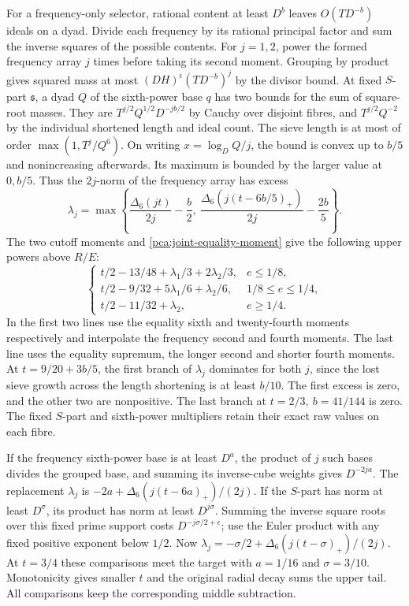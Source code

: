For a frequency-only selector, rational content at least \(D^b\)
leaves \(O(TD^{-b})\) ideals on a dyad. Divide each frequency
by its rational principal factor and sum the inverse squares
of the possible contents. For \(j=1,2\), power the formed
frequency array \(j\) times before taking its second moment.
Grouping by product gives squared mass at most
\((DH)^\epsilon(TD^{-b})^j\) by the divisor bound.
At fixed \(S\)-part \(\mathfrak s\), a dyad \(Q\) of the
sixth-power base \(q\) has two bounds for the sum of square-root
masses. They are \(T^{j/2} Q^{1/2}D^{-jb/2}\)
by Cauchy over disjoint fibres, and \(T^{j/2}Q^{-2}\)
by the individual shortened length and ideal count.
The sieve length is at most of order \(\max(1,T^j/Q^6)\).
On writing \(x=\log_D Q/j\), the bound is convex up to \(b/5\)
and nonincreasing afterwards. Its maximum is bounded by the
larger value at \(0,b/5\). Thus the \(2j\)-norm of the
frequency array has excess
\[
 \lambda_j=
 \max\left\{\frac{\Delta_6(jt)}{2j}-\frac b2,\
   \frac{\Delta_6(j(t-6b/5)_+)}{2j}-\frac{2b}5\right\}.
\]
The two cutoff moments and \eqref{pca:joint-equality-moment}
give the following upper powers above \(R/E\):
\[
 \begin{cases}
 t/2-13/48+\lambda_1/3+2\lambda_2/3,&e\le1/8,\\
 t/2-9/32+5\lambda_1/6+\lambda_2/6,&1/8\le e\le1/4,\\
 t/2-11/32+\lambda_2,&e\ge1/4.
 \end{cases}
\]
In the first two lines use the equality sixth and twenty-fourth
moments respectively and interpolate the frequency second and
fourth moments. The last line uses the equality supremum,
the longer second and shorter fourth moments.
At \(t=9/20+3b/5\), the first branch of \(\lambda_j\)
dominates for both \(j\), since the lost sieve growth across
the length shortening is at least \(b/10\).
The first excess is zero, and the other two are nonpositive.
The last branch at \(t=2/3,\ b=41/144\) is zero.
The fixed \(S\)-part and sixth-power multipliers retain
their exact raw values on each fibre.

If the frequency sixth-power base is at least \(D^a\),
the product of \(j\) such bases divides the grouped base,
and summing its inverse-cube weights gives \(D^{-2ja}\).
The replacement \(\lambda_j\) is
\(-2a+\Delta_6(j(t-6a)_+)/(2j)\).
If the \(S\)-part has norm at least \(D^\sigma\), its product
has norm at least \(D^{j\sigma}\).
Summing the inverse square roots over this fixed prime support
costs \(D^{-j\sigma/2+\epsilon}\); use the Euler product
with any fixed positive exponent below \(1/2\).
Now \(\lambda_j=-\sigma/2+\Delta_6(j(t-\sigma)_+)/(2j)\).
At \(t=3/4\) these comparisons meet the target with
\(a=1/16\) and \(\sigma=3/10\).
Monotonicity gives smaller \(t\) and the original radial
decay sums the upper tail. All comparisons keep the
corresponding middle subtraction.

